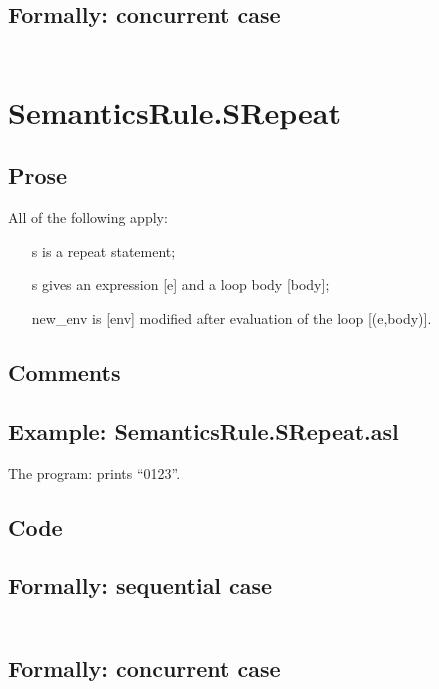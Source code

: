 \documentclass{book}
\begin{document}
  \subsection{Formally: concurrent case}
  \begin{align}
  \end{align} 

\section{SemanticsRule.SRepeat \label{sec:SemanticsRule.SRepeat}}

    \subsection{Prose}
    All of the following apply:
    \begin{itemize}
    \item [s] is a repeat statement;
    \item [s] gives an expression [e] and a loop body [body];
    \item [new\_env] is [env] modified after evaluation of the loop [(e,body)].
    \end{itemize}

    \subsection{Comments}

    \subsection{Example: SemanticsRule.SRepeat.asl}
    The program:
    prints ``0123''.

  \subsection{Code}

  \subsection{Formally: sequential case}
  \begin{align}
  \end{align} 

  \subsection{Formally: concurrent case}
  \begin{align}
  \end{align} 
\end{document}
